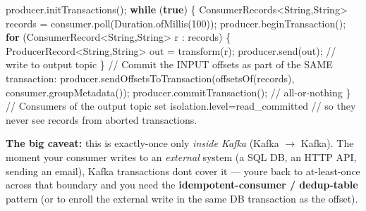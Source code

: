 \documentclass[11pt]{article}
\newenvironment{Shaded}{\begin{snugshade}}{\end{snugshade}}
\newcommand{\BuiltInTok}[1]{\textcolor[rgb]{0.50,0.55,0.55}{#1}}
\newcommand{\CommentTok}[1]{\textcolor[rgb]{0.48,0.49,0.49}{#1}}
\newcommand{\ControlFlowTok}[1]{\textcolor[rgb]{0.99,0.74,0.29}{\textbf{#1}}}
\newcommand{\DecValTok}[1]{\textcolor[rgb]{0.96,0.45,0.00}{#1}}
\newcommand{\FunctionTok}[1]{\textcolor[rgb]{0.56,0.27,0.68}{#1}}
\newcommand{\KeywordTok}[1]{\textcolor[rgb]{0.81,0.81,0.76}{\textbf{#1}}}
\newcommand{\NormalTok}[1]{\textcolor[rgb]{0.81,0.81,0.76}{#1}}
\newcommand{\OperatorTok}[1]{\textcolor[rgb]{0.81,0.81,0.76}{#1}}
\begin{document}
\begin{Shaded}
\begin{Highlighting}[]
\NormalTok{producer}\OperatorTok{.}\FunctionTok{initTransactions}\OperatorTok{();}
\ControlFlowTok{while} \OperatorTok{(}\KeywordTok{true}\OperatorTok{)} \OperatorTok{\{}
\NormalTok{    ConsumerRecords}\OperatorTok{\textless{}}\BuiltInTok{String}\OperatorTok{,}\BuiltInTok{String}\OperatorTok{\textgreater{}}\NormalTok{ records }\OperatorTok{=}\NormalTok{ consumer}\OperatorTok{.}\FunctionTok{poll}\OperatorTok{(}\BuiltInTok{Duration}\OperatorTok{.}\FunctionTok{ofMillis}\OperatorTok{(}\DecValTok{100}\OperatorTok{));}
\NormalTok{    producer}\OperatorTok{.}\FunctionTok{beginTransaction}\OperatorTok{();}
    \ControlFlowTok{for} \OperatorTok{(}\NormalTok{ConsumerRecord}\OperatorTok{\textless{}}\BuiltInTok{String}\OperatorTok{,}\BuiltInTok{String}\OperatorTok{\textgreater{}}\NormalTok{ r }\OperatorTok{:}\NormalTok{ records}\OperatorTok{)} \OperatorTok{\{}
\NormalTok{        ProducerRecord}\OperatorTok{\textless{}}\BuiltInTok{String}\OperatorTok{,}\BuiltInTok{String}\OperatorTok{\textgreater{}}\NormalTok{ out }\OperatorTok{=} \FunctionTok{transform}\OperatorTok{(}\NormalTok{r}\OperatorTok{);}
\NormalTok{        producer}\OperatorTok{.}\FunctionTok{send}\OperatorTok{(}\NormalTok{out}\OperatorTok{);}                       \CommentTok{// write to output topic}
    \OperatorTok{\}}
    \CommentTok{// Commit the INPUT offsets as part of the SAME transaction:}
\NormalTok{    producer}\OperatorTok{.}\FunctionTok{sendOffsetsToTransaction}\OperatorTok{(}\FunctionTok{offsetsOf}\OperatorTok{(}\NormalTok{records}\OperatorTok{),}\NormalTok{ consumer}\OperatorTok{.}\FunctionTok{groupMetadata}\OperatorTok{());}
\NormalTok{    producer}\OperatorTok{.}\FunctionTok{commitTransaction}\OperatorTok{();}                 \CommentTok{// all{-}or{-}nothing}
\OperatorTok{\}}
\CommentTok{// Consumers of the output topic set isolation.level=read\_committed}
\CommentTok{// so they never see records from aborted transactions.}
\end{Highlighting}
\end{Shaded}

\textbf{The big caveat:} this is exactly-once only \emph{inside Kafka} (Kafka \(\rightarrow\) Kafka). The moment your consumer writes to an \emph{external} system (a SQL DB, an HTTP API, sending an email), Kafka transactions don\textquotesingle t cover it --- you\textquotesingle re back to at-least-once across that boundary and you need the \textbf{idempotent-consumer / dedup-table} pattern (or to enroll the external write in the same DB transaction as the offset).
\end{document}
